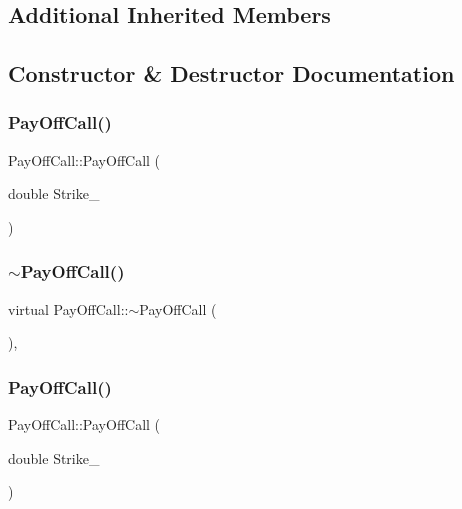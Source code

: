 \subsection*{Additional Inherited Members}


\subsection{Constructor \& Destructor Documentation}
\hypertarget{classPayOffCall_ac9f6304d62e33fbce6c2db1a82c312dc}{}\label{classPayOffCall_ac9f6304d62e33fbce6c2db1a82c312dc} 
\subsubsection{\texorpdfstring{Pay\+Off\+Call()}{PayOffCall()}\hspace{0.1cm}{\footnotesize\ttfamily [1/3]}}
{\footnotesize\ttfamily Pay\+Off\+Call\+::\+Pay\+Off\+Call (\begin{DoxyParamCaption}\item[{double}]{Strike\+\_\+ }\end{DoxyParamCaption})}

\hypertarget{classPayOffCall_a0cab46272abe31e91b04dd835ef0e7ee}{}\label{classPayOffCall_a0cab46272abe31e91b04dd835ef0e7ee} 
\subsubsection{\texorpdfstring{$\sim$\+Pay\+Off\+Call()}{~PayOffCall()}\hspace{0.1cm}{\footnotesize\ttfamily [1/2]}}
{\footnotesize\ttfamily virtual Pay\+Off\+Call\+::$\sim$\+Pay\+Off\+Call (\begin{DoxyParamCaption}{ }\end{DoxyParamCaption})\hspace{0.3cm}{\ttfamily [inline]}, {\ttfamily [virtual]}}

\hypertarget{classPayOffCall_ac9f6304d62e33fbce6c2db1a82c312dc}{}\label{classPayOffCall_ac9f6304d62e33fbce6c2db1a82c312dc} 
\subsubsection{\texorpdfstring{Pay\+Off\+Call()}{PayOffCall()}\hspace{0.1cm}{\footnotesize\ttfamily [2/3]}}
{\footnotesize\ttfamily Pay\+Off\+Call\+::\+Pay\+Off\+Call (\begin{DoxyParamCaption}\item[{double}]{Strike\+\_\+ }\end{DoxyParamCaption})}


